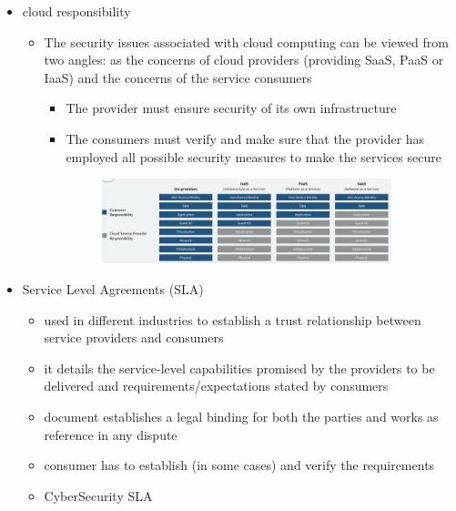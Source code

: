 \documentclass{article}
\begin{document}
\begin{itemize}
\begin{itemize}
\begin{enumerate}
\begin{figure}[h]
            \end{figure}
        \end{enumerate}
    \end{itemize}
    \item cloud responsibility
    \begin{itemize}
        \item The security issues associated with cloud computing can be viewed from two angles: as the concerns of cloud providers (providing SaaS, PaaS or IaaS) and the concerns of the service consumers
        \begin{itemize}
            \item The provider must ensure security of its own infrastructure
            \item The consumers must verify and make sure that the provider has employed all possible security measures to make the services secure
            \begin{figure}[h]
                \centering
                \includegraphics[width=0.90\textwidth]{figure/cloud_responsibility.png}
            \end{figure}
        \end{itemize}
    \end{itemize}
    \item Service Level Agreements (SLA)
    \begin{itemize}
        \item used in different industries to establish a trust relationship between service providers and consumers
        \item it details the service-level capabilities promised by the providers to be delivered and requirements/expectations stated by consumers
        \item document establishes a legal binding for both the parties and works as reference in any dispute
        \item consumer has to establish (in some cases) and verify the requirements
        \item CyberSecurity SLA 

\end{itemize}
\end{itemize}
\end{document}
